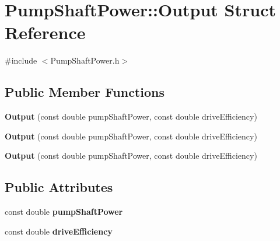\hypertarget{struct_pump_shaft_power_1_1_output}{}\section{Pump\+Shaft\+Power\+:\+:Output Struct Reference}
\label{struct_pump_shaft_power_1_1_output}


{\ttfamily \#include $<$Pump\+Shaft\+Power.\+h$>$}

\subsection*{Public Member Functions}
\begin{DoxyCompactItemize}
\item 
\mbox{\label{struct_pump_shaft_power_1_1_output_a8ff61548debb80f74496b486f77c4e5e}} 
{\bfseries Output} (const double pump\+Shaft\+Power, const double drive\+Efficiency)
\item 
\mbox{\label{struct_pump_shaft_power_1_1_output_a8ff61548debb80f74496b486f77c4e5e}} 
{\bfseries Output} (const double pump\+Shaft\+Power, const double drive\+Efficiency)
\item 
\mbox{\label{struct_pump_shaft_power_1_1_output_a8ff61548debb80f74496b486f77c4e5e}} 
{\bfseries Output} (const double pump\+Shaft\+Power, const double drive\+Efficiency)
\end{DoxyCompactItemize}
\subsection*{Public Attributes}
\begin{DoxyCompactItemize}
\item 
\mbox{\label{struct_pump_shaft_power_1_1_output_ac3f600a571d7c93bb67f84af7caad406}} 
const double {\bfseries pump\+Shaft\+Power}
\item 
\mbox{\label{struct_pump_shaft_power_1_1_output_aaccecb0ddeb130b91bf6bf33e32f17fd}} 
const double {\bfseries drive\+Efficiency}
\end{DoxyCompactItemize}


